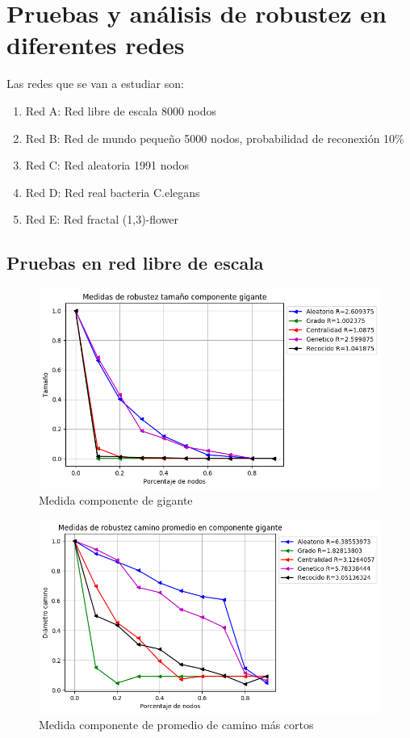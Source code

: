 \section{Pruebas y análisis de robustez en diferentes redes}

Las redes que se van a estudiar son:

\begin{enumerate}
    \item Red A: Red libre de escala 8000 nodos
    \item Red B: Red de mundo pequeño 5000 nodos, probabilidad de reconexión 10\%
    \item Red C: Red aleatoria 1991 nodos
    \item Red D: Red real bacteria C.elegans
    \item Red E: Red fractal (1,3)-flower
\end{enumerate}

\subsection{Pruebas en red libre de escala}

\begin{figure}[H]
    \centering
    \includegraphics[scale=0.7]{Capitulo5Robustez/imagenes/grafica_GC20180512_143117ScaleFree8000Nodes.png}
    \caption{Medida componente de gigante}
\end{figure}


\begin{figure}[H]
    \centering
    \includegraphics[scale=0.7]{Capitulo5Robustez/imagenes/grafica_APL20180512_143117ScaleFree8000Nodes.png}
    \caption{Medida componente de promedio de camino más cortos}
\end{figure}

